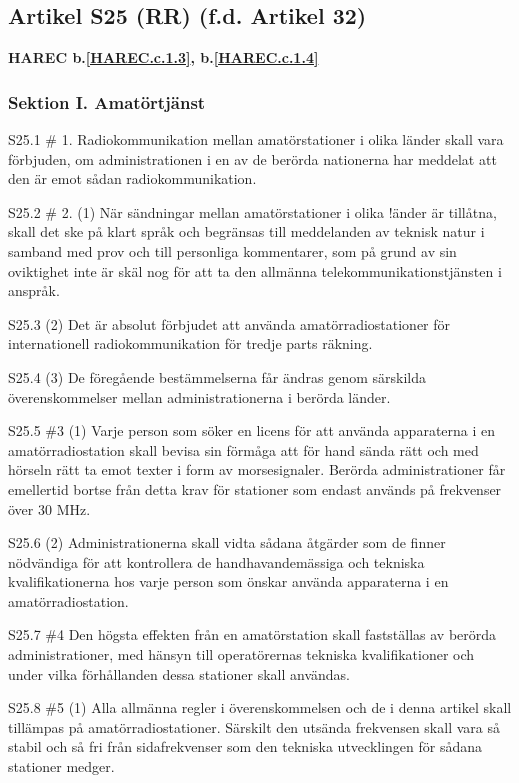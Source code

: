 \subsection{Artikel S25 (RR) (f.d. Artikel 32)}
\textbf{
HAREC b.\ref{HAREC.c.1.3}\label{myHAREC.c.1.3},
 b.\ref{HAREC.c.1.4}\label{myHAREC.c.1.4}
}

\subsubsection{Sektion I. Amatörtjänst}
S25.1 \# 1. Radiokommunikation mellan amatörstationer i olika länder
skall vara förbjuden, om administrationen i en av de berörda
nationerna har meddelat att den är emot sådan radiokommunikation.

S25.2 \# 2. (1) När sändningar mellan amatörstationer i olika !änder är
tillåtna, skall det ske på klart språk och begränsas till meddelanden
av teknisk natur i samband med prov och till personliga kommentarer,
som på grund av sin oviktighet inte är skäl nog för att ta den
allmänna telekommunikationstjänsten i anspråk.

S25.3 (2) Det är absolut förbjudet att använda amatörradiostationer
för internationell radiokommunikation för tredje parts räkning.

S25.4 (3) De föregående bestämmelserna får ändras genom särskilda
överenskommelser mellan administrationerna i berörda länder.

S25.5 \#3 (1) Varje person som söker en licens för att använda
apparaterna i en amatörradiostation skall bevisa sin förmåga att för
hand sända rätt och med hörseln rätt ta emot texter i form av
morsesignaler. Berörda administrationer får emellertid bortse från
detta krav för stationer som endast används på frekvenser över 30 MHz.

S25.6 (2) Administrationerna skall vidta sådana åtgärder som de finner
nödvändiga för att kontrollera de handhavandemässiga och tekniska
kvalifikationerna hos varje person som önskar använda apparaterna i en
amatörradiostation.

S25.7 \#4 Den högsta effekten från en amatörstation skall fastställas
av berörda administrationer, med hänsyn till operatörernas tekniska
kvalifikationer och under vilka förhållanden dessa stationer skall
användas.

S25.8 \#5 (1) Alla allmänna regler i överenskommelsen och de i denna
artikel skall tillämpas på amatörradiostationer. Särskilt den utsända
frekvensen skall vara så stabil och så fri från sidafrekvenser som den
tekniska utvecklingen för sådana stationer medger.

